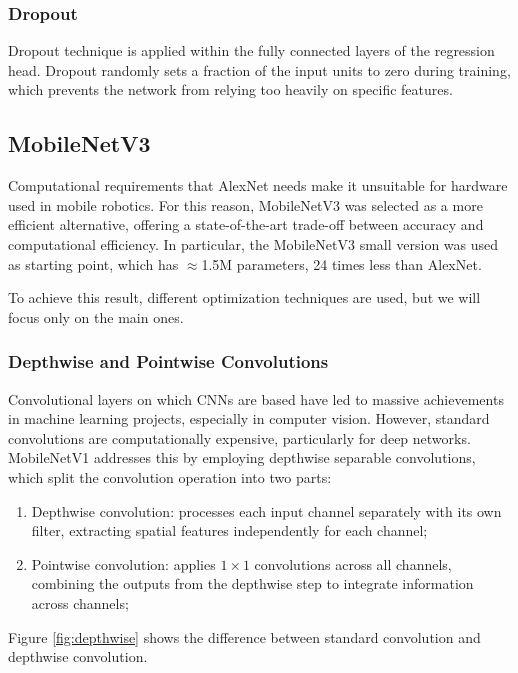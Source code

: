 \subsubsection{Dropout}
Dropout technique is applied within the fully connected layers of the regression head.  
Dropout randomly sets a fraction of the input units to zero during training, which prevents the network from
relying too heavily on specific features.

\subsection{MobileNetV3}
Computational requirements that AlexNet needs make it unsuitable for hardware used in mobile robotics. For this
reason, MobileNetV3 was selected as a more efficient alternative, offering a state-of-the-art trade-off between 
accuracy and computational efficiency. In particular, the
MobileNetV3 small version was used as starting point, which has $\approx$1.5M parameters, 24 times less 
than AlexNet.



To achieve this result, different optimization techniques are used, but we will focus only on the main ones.

\subsubsection{Depthwise and Pointwise Convolutions}
Convolutional layers on which CNNs are based have led to massive achievements in machine learning projects,
especially in computer vision. However, standard convolutions are computationally expensive, particularly
for deep networks. MobileNetV1 addresses this by employing depthwise separable convolutions, which split
the convolution operation into two parts: 
\begin{enumerate}
    \item Depthwise convolution: processes each input channel separately with its own filter, extracting 
    spatial features independently for each channel;
    \item Pointwise convolution: applies $1\times1$ convolutions across all channels, combining the outputs
    from the depthwise step to integrate information across channels;
\end{enumerate}
Figure \ref{fig:depthwise} shows the difference between standard convolution and depthwise convolution.

